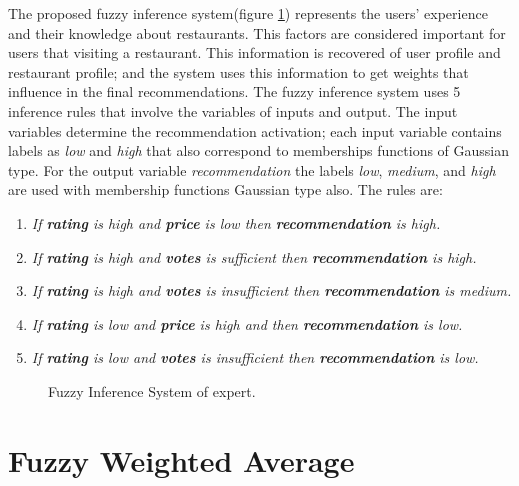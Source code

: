 The proposed fuzzy inference system(figure \ref{fig:expertfis})
represents the users' experience and their knowledge about restaurants.
This factors are considered important for users that visiting a
restaurant. This information is recovered of user profile and
restaurant profile; and the system uses this information to get
weights that influence in the final recommendations. The fuzzy
inference system uses 5 inference rules that involve the variables of
inputs and output. The input variables determine the recommendation
activation; each input variable contains labels as \textit{low} and
\textit{high} that also correspond to memberships functions of
Gaussian type. For the output variable \textit{recommendation} the
labels \textit{low}, \textit{medium}, and \textit{high} are used with
membership functions Gaussian type also. The rules are:
\begin{enumerate} 
\item \textit{If \textbf{rating} is high and \textbf{price} is low then 
\textbf{recommendation} is high.}
\item \textit{If \textbf{rating} is high and \textbf{votes} is sufficient then 
\textbf{recommendation} is high.}
\item \textit{If \textbf{rating} is high and \textbf{votes} is insufficient then 
\textbf{recommendation} is medium.}
\item \textit{If \textbf{rating} is low and \textbf{price} is high and then 
\textbf{recommendation} is low.} 
\item \textit{If \textbf{rating} is low and \textbf{votes} is insufficient then 
\textbf{recommendation} is low.}
\end{enumerate} 
\begin{figure}
\captionsetup{justification=centering,margin=2cm,font=footnotesize}
\centering
{}
\caption{Fuzzy Inference System of expert.}
\label{fig:expertfis}      
\end{figure}

\section{Fuzzy Weighted Average} 

